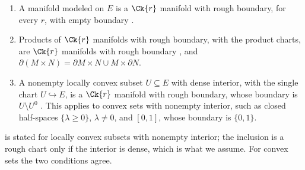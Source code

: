 \begin{proposition}[Examples]
  \label{prop:rough-examples}
  \leanok
  \begin{enumerate}
    \item A manifold modeled on $E$ is a $\Ck{r}$ manifold with rough boundary, for every $r$,
      with empty boundary \cite[Example 3.5.3(a), p.~279; Remark 3.5.7, p.~280]{GN26}.
    \item Products of $\Ck{r}$ manifolds with rough boundary, with the product charts, are
      $\Ck{r}$ manifolds with rough boundary \cite[Example 3.5.5, p.~279]{GN26}, and
      $\partial(M \times N) = \partial M \times N \cup M \times \partial N$.
    \item A nonempty locally convex subset $U \subseteq E$ with dense interior, with the single
      chart $U \hookrightarrow E$, is a $\Ck{r}$ manifold with rough boundary, whose boundary is
      $U \setminus U^0$ \cite[Example 3.5.3(b), p.~279; Remark 3.5.7, p.~280]{GN26}. This
      applies to convex sets with nonempty interior, such as closed half-spaces
      $\{\lambda \ge 0\}$, $\lambda \ne 0$, and $[0, 1]$, whose boundary is $\{0, 1\}$.
  \end{enumerate}
\end{proposition}

\begin{remark}
  \label{rem:rough-dense}
  \cite[Example 3.5.3(b)]{GN26} is stated for locally convex subsets with nonempty interior;
  the inclusion is a rough chart only if the interior is dense, which is what we assume. For
  convex sets the two conditions agree.
\end{remark}


